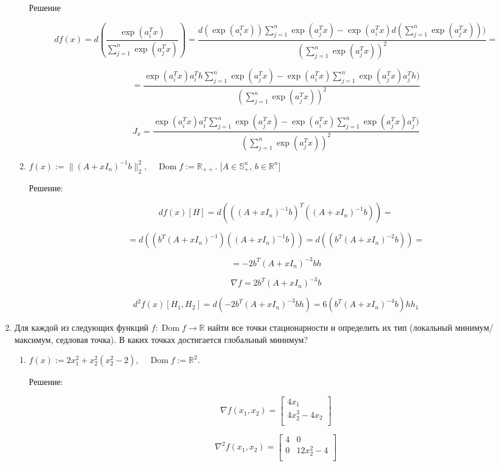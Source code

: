 \documentclass{article}
\newcommand{\R}{\mathbb{R}}
\renewcommand{\S}{\mathbb{S}}
\DeclareMathOperator*{\Dom}{Dom}
\begin{document}
\begin{enumerate}[label=\textbf{\arabic*}, leftmargin=0em]
\begin{enumerate}
Решение

$$
df(x) = d(\frac{\exp(a_i^T x)}{\sum\limits_{j=1}^n \exp(a_j^T x)}) = \frac{d(\exp(a_i^T x)) \sum\limits_{j=1}^n \exp(a_j^T x) - \exp(a_i^T x) d(\sum\limits_{j=1}^n \exp(a_j^T x)))}{ (\sum\limits_{j=1}^n \exp(a_j^T x))^2} =
$$

$$
= \frac{\exp(a_i^T x)a_i^Th\sum\limits_{j=1}^n \exp(a_j^T x) - \exp(a_i^T x) \sum\limits_{j=1}^n \exp(a_j^T x)a_j^Th)}{ (\sum\limits_{j=1}^n \exp(a_j^T x))^2}
$$


$$
J_x = \frac{\exp(a_i^T x)a_i^T\sum\limits_{j=1}^n \exp(a_j^T x) - \exp(a_i^T x) \sum\limits_{j=1}^n \exp(a_j^T x)a_j^T)}{ (\sum\limits_{j=1}^n \exp(a_j^T x))^2}
$$

\item $\displaystyle f(x) := \|\left(A + x I_n \right)^{-1} b \|_2^2, \quad \Dom f := \R_{++}$. \hfill[$A \in \S^n_+$, $b \in \R^n$]

Решение:

$$
df(x)[H] = d(((A + x I_n )^{-1} b)^T((A + x I_n )^{-1} b)) =
$$

$$
= d((b^T(A + xI_n)^{-1})((A + x I_n)^{-1} b)) = d((b^T(A + xI_n)^{-2}b)) =
$$

$$
= -2b^T(A + xI_n)^{-3}bh
$$


$$
\nabla f = 2b^T(A + xI_n)^{-3}b
$$

$$
d^2 f(x)[H_1, H_2] = d(-2b^T(A + xI_n)^{-3}bh) = 6(b^T(A + xI_n)^{-4}b)hh_1
$$

\end{enumerate}

\item Для каждой из следующих функций $f : \Dom f \rightarrow \R$ найти все точки стационарности и определить их тип (локальный минимум/максимум, седловая точка). В каких точках достигается глобальный минимум?
\begin{enumerate}
\item $\displaystyle f(x) := 2 x_1^2 + x_2^2 (x_2^2 - 2), \quad \Dom f := \R^2$.

Решение:

$$
\nabla f(x_1, x_2)  =
\begin{bmatrix}
4x_1\\
4x_2^3 - 4x_2\\
\end{bmatrix}
$$


$$
\nabla^2 f(x_1, x_2)  =
\begin{bmatrix}
4 & 0\\
0 & 12x_2^2 - 4\\
\end{bmatrix}
$$


\end{enumerate}
\end{enumerate}
\end{document}
